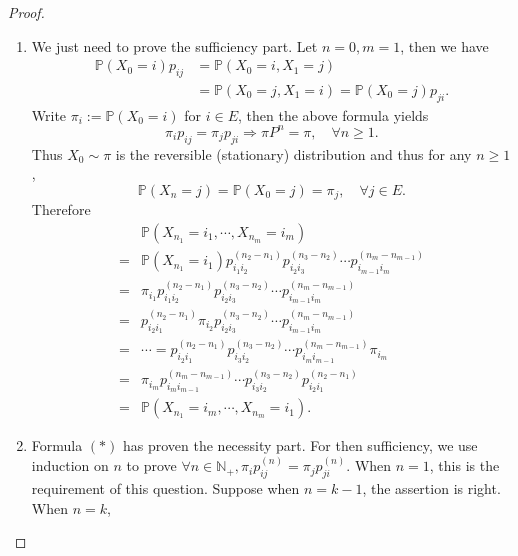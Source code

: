 \documentclass[12pt]{article}
\renewcommand{\(}{\left(}%
\renewcommand{\)}{\right)}%
\renewcommand{\[}{\left[}%
\renewcommand{\]}{\right]}%
\newcommand{\p}{\mathbb{P}}
\newcommand{\n}{\mathbb{N}}
\newtheorem{proof}{Proof.}}
\begin{document}
 \begin{proof}
  \begin{enumerate}
   \item We just need to prove the sufficiency part. Let $n=0,m=1$, then we have
   \begin{equation*}
   	\begin{split}
   		\p(X_0=i)p_{ij}&=\p(X_0=i,X_1=j)\\
   		&=\p(X_0=j,X_1=i)=\p(X_0=j)p_{ji}.
   	\end{split}
   \end{equation*}
   Write $\pi_i:=\p(X_0=i)$ for $i\in E$, then the above formula yields
   \begin{equation*}
   	\pi_ip_{ij}=\pi_jp_{ji}\Longrightarrow \pi P^n=\pi,\quad\forall n\geq 1.\tag{$*$}
   \end{equation*}
   Thus $X_0\sim \pi$ is the reversible (stationary) distribution and thus for any $n\geq 1$,
   \begin{equation*}
   	\p(X_n=j)=\p(X_0=j)=\pi_j,\quad\forall j\in E.
   \end{equation*}
   Therefore
   \begin{equation*}
   	\begin{split}
   		&\p(X_{n_1}=i_1,\cdots,X_{n_m}=i_m )\\
   		=&\p(X_{n_1}=i_1)p_{i_1i_2}^{(n_2-n_1)}p_{i_2i_3}^{(n_3-n_2)}\cdots p_{i_{m-1}i_m}^{(n_m-n_{m-1})}\\
   		=&\pi_{i_1}p_{i_1i_2}^{(n_2-n_1)}p_{i_2i_3}^{(n_3-n_2)}\cdots p_{i_{m-1}i_m}^{(n_m-n_{m-1})}\\
   		=&p_{i_2i_1}^{(n_2-n_1)}\pi_{i_2}p_{i_2i_3}^{(n_3-n_2)}\cdots p_{i_{m-1}i_m}^{(n_m-n_{m-1})}\\
   		=&\cdots= p_{i_2i_1}^{(n_2-n_1)}p_{i_3i_2}^{(n_3-n_2)}\cdots p_{i_{m}i_{m-1}}^{(n_m-n_{m-1})}\pi_{i_m}\\
   		=&\pi_{i_m}p_{i_{m}i_{m-1}}^{(n_m-n_{m-1})}\cdots p_{i_3i_2}^{(n_3-n_2)}p_{i_2i_1}^{(n_2-n_1)} \\
   		=&\p(X_{n_1}=i_m,\cdots,X_{n_m}=i_1).
   	\end{split}
   \end{equation*}
   \item  Formula $(*)$ has proven the necessity part. For then sufficiency, we use induction on $n$ to prove $\forall n\in\n_+,\pi_ip_{ij}^{(n)}=\pi_jp_{ji}^{(n)}$. When $n=1$, this is the requirement of this question. Suppose when $n=k-1$, the assertion is right. When $n=k$,
   \begin{equation*}

\end{equation*}
\end{enumerate}
\end{proof}
\end{document}
